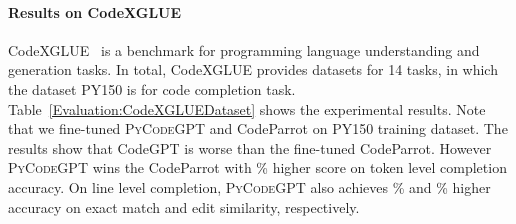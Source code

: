 \documentclass{article}
\newcommand{\codepy}{\textsc{PyCodeGPT}\xspace}
\begin{document}
\paragraph{Results on CodeXGLUE}
CodeXGLUE~\cite{lu2021codexglue} is a benchmark for programming language understanding and generation tasks. In total, CodeXGLUE provides datasets for 14 tasks, in which the dataset PY150 is for code completion task. Table~\ref{Evaluation:CodeXGLUEDataset} shows the experimental results. Note that we fine-tuned \codepy and CodeParrot on PY150 training dataset. The results show that CodeGPT is worse than the fine-tuned CodeParrot. However \codepy wins the CodeParrot with \% higher score on token level completion accuracy. On line level completion, \codepy also achieves \% and \% higher accuracy on exact match and edit similarity, respectively.
\end{document}
